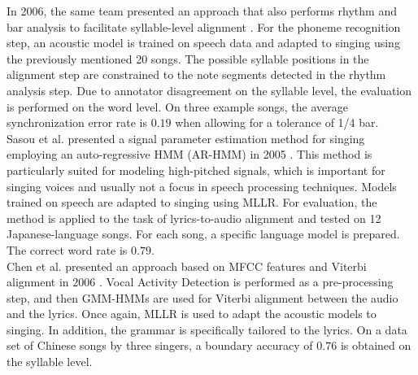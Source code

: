 In 2006, the same team presented an approach that also performs rhythm and bar analysis to facilitate syllable-level alignment \cite{Iskandar:2006}. For the phoneme recognition step, an acoustic model is trained on speech data and adapted to singing using the previously mentioned 20 songs. The possible syllable positions in the alignment step are constrained to the note segments detected in the rhythm analysis step. Due to annotator disagreement on the syllable level, the evaluation is performed on the word level. On three example songs, the average synchronization error rate is $0.19$ when allowing for a tolerance of 1/4 bar.\\  

Sasou et al. presented a signal parameter estimation method for singing employing an auto-regressive HMM (AR-HMM) in 2005 \cite{Sasou2005AnAN}. This method is particularly suited for modeling high-pitched signals, which is important for singing voices and usually not a focus in speech processing techniques. Models trained on speech are adapted to singing using MLLR. For evaluation, the method is applied to the task of lyrics-to-audio alignment and tested on 12 Japanese-language songs. For each song, a specific language model is prepared. The correct word rate is $0.79$.\\

Chen et al. presented an approach based on MFCC features and Viterbi alignment in 2006 \cite{popular_synchronization}. Vocal Activity Detection is performed as a pre-processing step, and then GMM-HMMs are used for Viterbi alignment between the audio and the lyrics. Once again, MLLR is used to adapt the acoustic models to singing. In addition, the grammar is specifically tailored to the lyrics. On a data set of Chinese songs by three singers, a boundary accuracy of $0.76$ is obtained on the syllable level.\\

